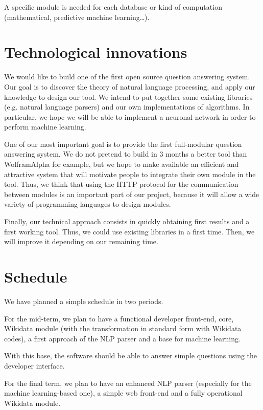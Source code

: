 \documentclass[a4paper,10pt]{article}
\begin{document}
A specific module is needed for each database or kind of computation (mathematical, predictive machine learning\ldots).

\section{Technological innovations}

We would like to build one of the first open source question answering system. Our goal is to discover the theory of natural language processing, and apply our knowledge to design our tool. We intend to put together some existing libraries (e.g. natural language parsers) and our own implementations of algorithms. In particular, we hope we will be able to implement a neuronal network in order to perform machine learning.

One of our most important goal is to provide the first full-modular question answering system. We do not pretend to build in 3 months a better tool than WolframAlpha for example, but we hope to make available an efficient and attractive system that will motivate people to integrate their own module in the tool. Thus, we think that using the HTTP protocol for the communication between modules is an important part of our project, because it will allow a wide variety of programming languages to design modules.

Finally, our technical approach consists in quickly obtaining first results and a first working tool. Thus, we could use existing libraries in a first time. Then, we will improve it depending on our remaining time.

\section{Schedule}

We have planned a simple schedule in two periods.

For the mid-term, we plan to have a functional developer front-end, core, Wikidata module (with the transformation in standard form with Wikidata codes), a first approach of the NLP parser and a base for machine learning.

With this base, the software should be able to answer simple questions using the developer interface.

For the final term, we plan to have an enhanced NLP parser (especially for the machine learning-based one), a simple web front-end and a fully operational Wikidata module.
\end{document}
